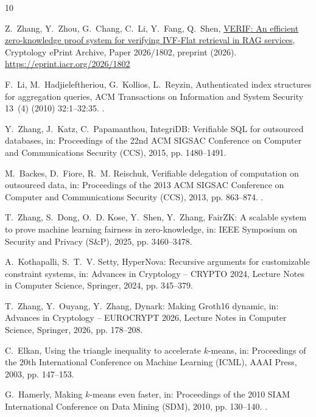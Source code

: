 \documentclass[5p,times,twocolumn]{elsarticle}
\begin{document}
\begin{thebibliography}{10}

Z.~Zhang, Y.~Zhou, G.~Chang, C.~Li, Y.~Fang, Q.~Shen,
  \href{https://eprint.iacr.org/2026/1802}{{VERIF}: An efficient zero-knowledge
  proof system for verifying {IVF-Flat} retrieval in {RAG} services},
  Cryptology ePrint Archive, Paper 2026/1802, preprint (2026).
\newline\urlprefix\url{https://eprint.iacr.org/2026/1802}

F.~Li, M.~Hadjieleftheriou, G.~Kollios, L.~Reyzin, Authenticated index structures for aggregation queries, ACM Transactions on Information and System Security 13~(4) (2010) 32:1--32:35. \newblock \href {https://doi.org/10.1145/1880022.1880026} {}.

Y.~Zhang, J.~Katz, C.~Papamanthou, {IntegriDB}: Verifiable {SQL} for outsourced databases, in: Proceedings of the 22nd ACM SIGSAC Conference on Computer and Communications Security (CCS), 2015, pp. 1480--1491.

M.~Backes, D.~Fiore, R.~M. Reischuk, Verifiable delegation of computation on outsourced data, in: Proceedings of the 2013 ACM SIGSAC Conference on Computer and Communications Security (CCS), 2013, pp. 863--874. \newblock \href {https://doi.org/10.1145/2508859.2516681} {}.

T.~Zhang, S.~Dong, O.~D. Kose, Y.~Shen, Y.~Zhang, {FairZK}: A scalable system to prove machine learning fairness in zero-knowledge, in: IEEE Symposium on Security and Privacy (S\&P), 2025, pp. 3460--3478.

A.~Kothapalli, S.~T.~V. Setty, {HyperNova}: Recursive arguments for customizable constraint systems, in: Advances in Cryptology -- CRYPTO 2024, Lecture Notes in Computer Science, Springer, 2024, pp. 345--379.

T.~Zhang, Y.~Ouyang, Y.~Zhang, {Dynark}: Making {Groth16} dynamic, in: Advances in Cryptology -- EUROCRYPT 2026, Lecture Notes in Computer Science, Springer, 2026, pp. 178--208.

C.~Elkan, Using the triangle inequality to accelerate $k$-means, in: Proceedings of the 20th International Conference on Machine Learning (ICML), AAAI Press, 2003, pp. 147--153.

G.~Hamerly, Making $k$-means even faster, in: Proceedings of the 2010 SIAM International Conference on Data Mining (SDM), 2010, pp. 130--140. \newblock \href {https://doi.org/10.1137/1.9781611972801.12} {}.


\end{thebibliography}
\end{document}
